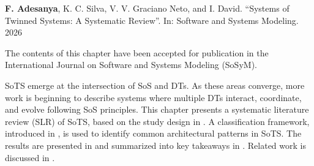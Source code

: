 \begin{publicationbox}{\resizebox{0.5cm}{!}{\faFileText}}
    \textbf{F. Adesanya}, K. C. Silva, V. V. Graciano Neto, and I. David. ``Systems of Twinned Systems: A Systematic Review''. In: Software and Systems Modeling. 2026

    \tcblower
    
    The contents of this chapter have been accepted for publication in the International Journal on Software and Systems Modeling (SoSyM).
\end{publicationbox}

SoTS emerge at the intersection of SoS and DTs. As these areas converge, more work is beginning to describe systems where multiple DTs interact, coordinate, and evolve following SoS principles.  This chapter presents a systematic literature review (SLR) of SoTS, based on the study design in . A classification framework, introduced in , is used to identify common architectural patterns in SoTS. The results are presented in  and summarized into key takeaways in . Related work is discussed in .
